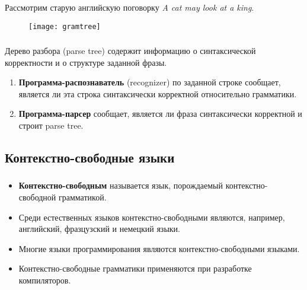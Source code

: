 \begin{frame}

	\frametitle{\insertsection}
	\framesubtitle{\insertsubsection}
	
	Рассмотрим старую английскую поговорку \textit{A cat may look at a king}.
	
	\begin{figure}
		\texttt{[image: gramtree]}
	\end{figure}

\end{frame}


\begin{frame}

	\frametitle{\insertsection}
	\framesubtitle{\insertsubsection}
	
	Дерево разбора (parse tree) содержит информацию о синтаксической корректности и о структуре заданной фразы.
	
	\begin{enumerate}
		\item \textbf{Программа-распознаватель} (recognizer) по заданной строке сообщает, является ли эта строка синтаксически корректной относительно грамматики.
		\item \textbf{Программа-парсер} сообщает, является ли фраза синтаксически корректной и строит parse tree.
	\end{enumerate}

\end{frame}

\subsection{Контекстно-свободные языки}

\begin{frame}

	\frametitle{\insertsection}
	\framesubtitle{\insertsubsection}
	
	\begin{itemize}
		\item \textbf{Контекстно-свободным} называется язык, порождаемый контекстно-свободной грамматикой.
		\item Среди естественных языков контекстно-свободными являются, например, английский, фразцузский и немецкий языки.
		\item Многие языки программирования являются контекстно-свободными языками.
		\item Контекстно-свободные грамматики применяются при разработке компиляторов.
	\end{itemize}
	
\end{frame}

